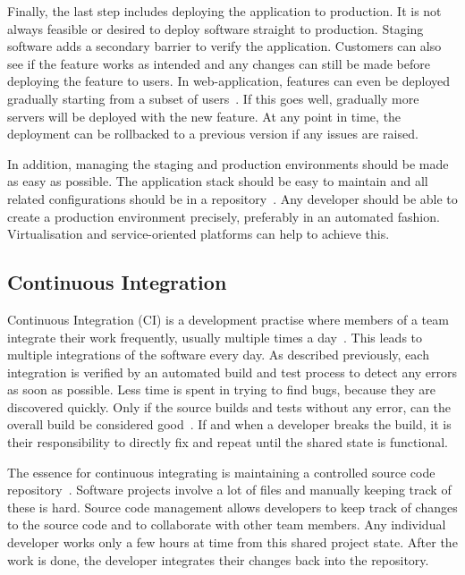 \documentclass[english]{tktltiki2}
\begin{document}
Finally, the last step includes deploying the application to production. It is not always feasible or desired to deploy software straight to production. Staging software adds a secondary barrier to verify the application. Customers can also see if the feature works as intended and any changes can still be made before deploying the feature to users. In web-application, features can even be deployed gradually starting from a subset of users~\cite{Bos12}. If this goes well, gradually more servers will be deployed with the new feature. At any point in time, the deployment can be rollbacked to a previous version if any issues are raised.

In addition, managing the staging and production environments should be made as easy as possible. The application stack should be easy to maintain and all related configurations should be in a repository~\cite{HF11}. Any developer should be able to create a production environment precisely, preferably in an automated fashion. Virtualisation and service-oriented platforms can help to achieve this.

\subsection{Continuous Integration}

Continuous Integration (CI) is a development practise where members of a team integrate their work frequently, usually multiple times a day~\cite{Fow06}. This leads to multiple integrations of the software every day. As described previously, each integration is verified by an automated build and test process to detect any errors as soon as possible. Less time is spent in trying to find bugs, because they are discovered quickly. Only if the source builds and tests without any error, can the overall build be considered good~\cite{Fow06}. If and when a developer breaks the build, it is their responsibility to directly fix and repeat until the shared state is functional.

The essence for continuous integrating is maintaining a controlled source code repository~\cite{Fow06}. Software projects involve a lot of files and manually keeping track of these is hard. Source code management allows developers to keep track of changes to the source code and to collaborate with other team members. Any individual developer works only a few hours at time from this shared project state. After the work is done, the developer integrates their changes back into the repository.
\end{document}
